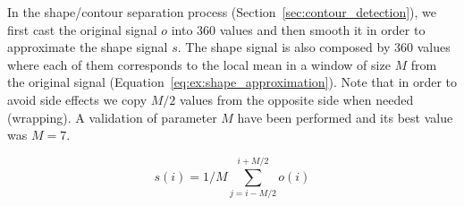 In the shape/contour separation process (Section~\ref{sec:contour_detection}), we first cast the original signal $o$ into 360 values and then smooth it in order to approximate the shape signal $s$.
The shape signal is also composed by 360 values where each of them corresponds to the local mean in a window of size $M$ from the original signal (Equation~\ref{eq:ex:shape_approximation}).
Note that in order to avoid side effects we copy $M/2$ values from the opposite side when needed (wrapping).
A validation of parameter $M$ have been performed and its best value was $M=7$.

\begin{equation}
  \label{eq:ex:shape_approximation}
  s(i) = 1/M \sum_{j=i-M/2}^{i+M/2} o(i)
\end{equation}





